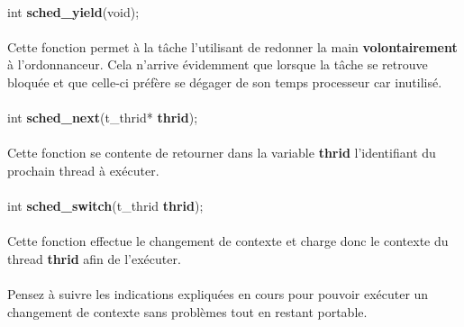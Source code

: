 \documentclass[10pt,a4wide]{article}
\begin{document}
\paragraph{}

\hspace{1.5cm}int \textbf{sched\_yield}(void);

\paragraph{}

Cette fonction permet \`a la t\^ache l'utilisant de redonner la main
\textbf{volontairement} \`a l'ordonnanceur. Cela n'arrive \'evidemment
que lorsque la t\^ache se retrouve bloqu\'ee et que celle-ci pr\'ef\`ere
se d\'egager de son temps processeur car inutilis\'e.

\paragraph{}

\hspace{1.5cm}int \textbf{sched\_next}(t\_thrid* \textbf{thrid});

\paragraph{}

Cette fonction se contente de retourner dans la variable \textbf{thrid}
l'identifiant du prochain thread \`a ex\'ecuter.

\paragraph{}

\hspace{1.5cm}int \textbf{sched\_switch}(t\_thrid \textbf{thrid});

\paragraph{}

Cette fonction effectue le changement de contexte et charge donc le contexte
du thread \textbf{thrid} afin de l'ex\'ecuter.

\paragraph{}

Pensez \`a suivre les indications expliqu\'ees en cours pour pouvoir
ex\'ecuter un changement de contexte sans probl\`emes tout en restant
portable.
\end{document}
